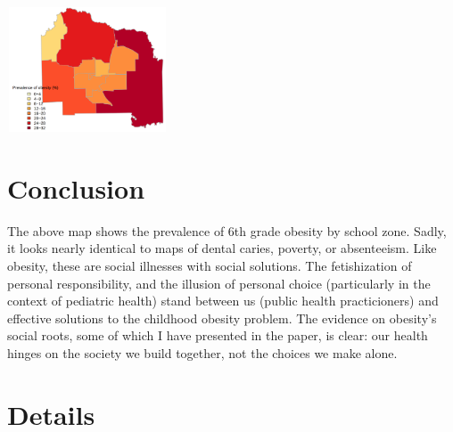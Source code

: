 \begin{multicols}{2}
\includegraphics[height=140, width=180]{alachua3.png}


\section*{Conclusion}
The above map shows the prevalence of 6th grade obesity by school zone.  Sadly, it looks nearly identical to maps of dental caries, poverty, or absenteeism.  Like obesity, these are social illnesses with social solutions. The fetishization of personal responsibility, and the illusion of personal choice (particularly in the context of pediatric health) stand between us (public health practicioners) and effective solutions to the childhood obesity problem.  The evidence on obesity's social roots, some of which I have presented in the paper, is clear: our health hinges on the society we build together, not the choices we make alone.




\newpage




\end{multicols}

\clearpage
\section*{Details}

